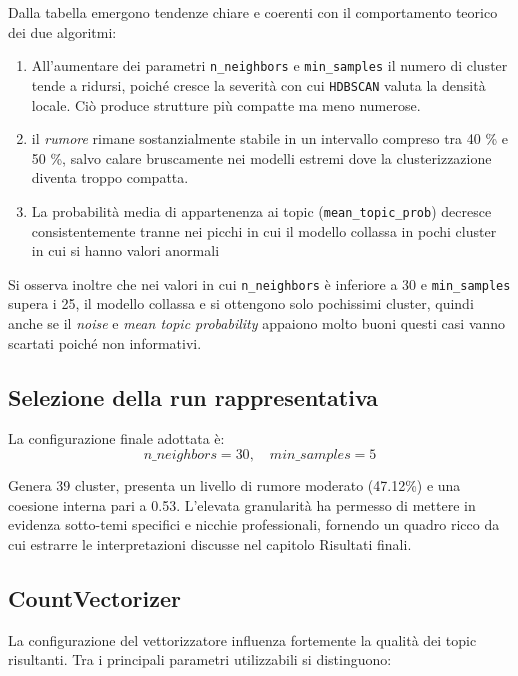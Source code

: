 \noindent
Dalla tabella emergono tendenze chiare e coerenti con il comportamento teorico dei due algoritmi:
\begin{enumerate}
    \item All’aumentare dei parametri \texttt{n\_neighbors} e \texttt{min\_samples} il numero di cluster tende a ridursi, poiché cresce la severità con cui \texttt{HDBSCAN} valuta la densità locale. Ciò produce strutture più compatte ma meno numerose.
    \item il \textit{rumore} rimane sostanzialmente stabile in un intervallo compreso tra 40 \% e 50 \%, salvo calare bruscamente nei modelli estremi dove la clusterizzazione diventa troppo compatta.
    \item La probabilità media di appartenenza ai topic (\texttt{mean\_topic\_prob}) decresce consistentemente tranne nei picchi in cui il modello collassa in pochi cluster in cui si hanno valori anormali
\end{enumerate}

\noindent Si osserva inoltre che nei valori in cui \texttt{n\_neighbors} è inferiore a 30 e \texttt{min\_samples} supera i 25, il modello collassa e si ottengono solo pochissimi cluster, quindi anche se il \textit{noise} e \textit{mean topic probability} appaiono molto buoni questi casi vanno scartati poiché non informativi.
\subsection{Selezione della run rappresentativa}

La configurazione finale adottata è:
\[
n\_neighbors = 30, \quad min\_samples = 5
\]

Genera 39 cluster, presenta un livello di rumore moderato (47.12\%) e una coesione interna pari a 0.53. L’elevata granularità ha permesso di mettere in evidenza sotto-temi specifici e nicchie professionali, fornendo un quadro ricco da cui estrarre le interpretazioni discusse nel capitolo Risultati finali.
\subsection{CountVectorizer}

\noindent La configurazione del vettorizzatore influenza fortemente la qualità dei topic risultanti. 
Tra i principali parametri utilizzabili si distinguono:

